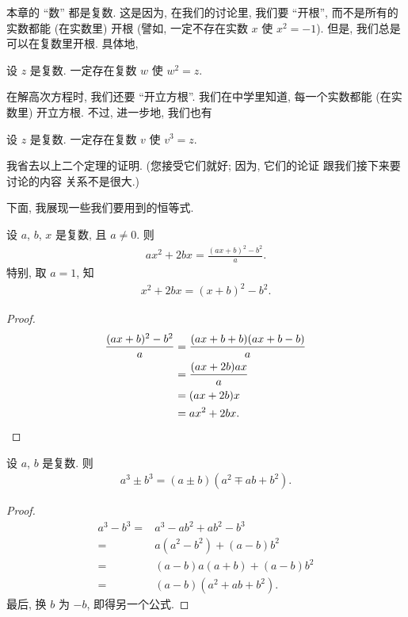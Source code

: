 \documentclass[%
    UTF8,%
    fontset=none,%
    punct=kaiming,%
    zihao=-4,%
    a4paper,%
    oneside,%
]{ctexbook}
\begin{document}
本章的 ``数'' 都是复数.
这是因为, 在我们的讨论里, 我们要 ``开根'',
而不是所有的实数都能 (在实数里) 开根
(譬如, 一定不存在实数 \(x\) 使 \(x^2 = -1\)).
但是, 我们总是可以在复数里开根.
具体地,

\begin{theorem}
    设 \(z\) 是复数.
    一定存在复数 \(w\) 使 \(w^2 = z\).
\end{theorem}

在解高次方程时, 我们还要 ``开立方根''.
我们在中学里知道, 每一个实数都能 (在实数里) 开立方根.
不过, 进一步地, 我们也有

\begin{theorem}
    设 \(z\) 是复数.
    一定存在复数 \(v\) 使 \(v^3 = z\).
\end{theorem}

我省去以上二个定理的证明.
(您接受它们就好;
因为, 它们的论证%
跟我们接下来要讨论的内容%
关系不是很大.)

下面, 我展现一些我们要用到的恒等式.

\begin{theorem}
    设 \(a\), \(b\), \(x\) 是复数,
    且 \(a \neq 0\).
    则
    \begin{align*}
        ax^2 + 2bx
        = \frac{(ax + b)^2 - b^2}{a}.
    \end{align*}
    特别, 取 \(a = 1\),
    知
    \begin{align*}
        x^2 + 2bx = (x + b)^2 - b^2.
    \end{align*}
\end{theorem}

\begin{proof}
    \begin{align*}
        \frac{(ax + b)^2 - b^2}{a}
        = {} & \frac{(ax + b + b)(ax + b - b)}{a} \\
        = {} & \frac{(ax + 2b)ax}{a}              \\
        = {} & (ax + 2b)x                         \\
        = {} & ax^2 + 2bx.
        \qedhere
    \end{align*}
\end{proof}

\begin{theorem}
    设 \(a\), \(b\) 是复数.
    则
    \begin{align*}
        a^3 \pm b^3 = (a \pm b)(a^2 \mp ab + b^2).
    \end{align*}
\end{theorem}

\begin{proof}
    \begin{align*}
        a^3 - b^3
        = {} & a^3 - ab^2 + ab^2 - b^3 \\
        = {} & a(a^2 - b^2) + (a-b)b^2 \\
        = {} & (a-b)a(a+b) + (a-b)b^2  \\
        = {} & (a-b)(a^2 + ab + b^2).
    \end{align*}
    最后, 换 \(b\) 为 \(-b\),
    即得另一个公式.
\end{proof}
\end{document}
